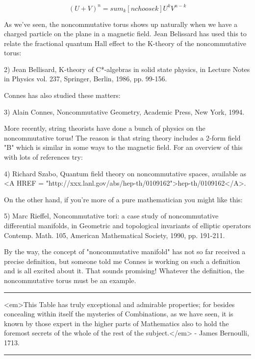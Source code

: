 $$

(U + V)^{n} = sum_{k} [n choose k] U^{k} V^{n-k}
$$
    
As we've seen, the noncommutative torus shows up naturally when we have
a charged particle on the plane in a magnetic field.  Jean Belissard has
used this to relate the fractional quantum Hall effect to the K-theory
of the noncommutative torus:

2) Jean Bellisard, K-theory of C*-algebras in solid state physics, in
Lecture Notes in Physics vol. 237, Springer, Berlin, 1986, pp. 99-156.

Connes has also studied these matters:

3) Alain Connes, Noncommutative Geometry, Academic Press, New
York, 1994.  

More recently, string theorists have done a bunch of physics on the
noncommutative torus!  The reason is that string theory includes a
2-form field "B" which is similar in some ways to the magnetic field.
For an overview of this with lots of references try:

4) Richard Szabo, Quantum field theory on noncommutative spaces,
available as <A HREF = "http://xxx.lanl.gov/abs/hep-th/0109162">hep-th/0109162</A>.  

On the other hand, if you're more of a pure mathematician you
might like this:

5) Marc Rieffel, Noncommutative tori: a case study of noncommutative
differential manifolds, in Geometric and topological invariants of
elliptic operators Contemp. Math. 105, American Mathematical Society,
1990, pp. 191-211.

By the way, the concept of "noncommutative manifold" has not so far
received a precise definition, but someone told me Connes is working on
such a definition and is all excited about it.  That sounds promising!
Whatever the definition, the noncommutative torus must be an example.

\par\noindent\rule{\textwidth}{0.4pt}
<em>This Table has truly exceptional and admirable properties;
for besides concealing within itself the mysteries of Combinations,
as we have seen, it is known by those expert in the higher parts of
Mathematics also to hold the foremost secrets of the whole of the
rest of the subject.</em> - James Bernoulli, 1713.

\par\noindent\rule{\textwidth}{0.4pt}

